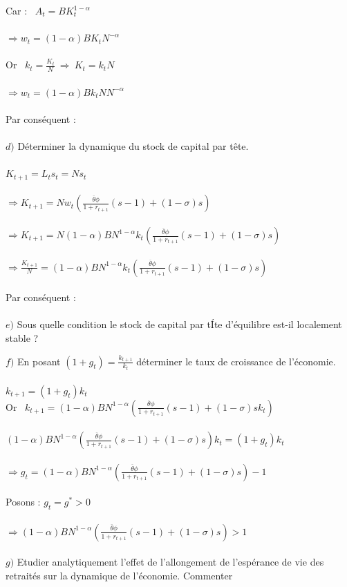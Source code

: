 \documentclass[11pt,twoside,a4paper]{article}
\begin{document}
Car : \ $A_t=BK^{1-\alpha}_t$\\ \\
$ \Rightarrow w_t=(1-\alpha)B K_tN^{-\alpha}$\\ \\
Or \ $k_t=\frac{K_t}{N} \ \Rightarrow \ K_t=k_tN$\\ \\
$ \Rightarrow w_t=(1-\alpha)B k_tNN^{-\alpha}$\\ \\
Par conséquent : \ \\ \\

$d)$ Déterminer la dynamique du stock de capital par t\^{e}te.\\ \\
$K_{t+1}=L_ts_t=Ns_t$\\ \\
$\Rightarrow K_{t+1}=Nw_t\left(\frac{\overline{\theta}\phi}{1+r_{t+1}}(s-1) +(1- \sigma)s \right)$\\ \\
$\Rightarrow K_{t+1}=N(1-\alpha)B N^{1-\alpha}k_t\left(\frac{\overline{\theta}\phi}{1+r_{t+1}}(s-1) +(1- \sigma)s \right)$\\ \\
$\Rightarrow \frac{K_{t+1}}{N}=(1-\alpha)B N^{1-\alpha}k_t\left(\frac{\overline{\theta}\phi}{1+r_{t+1}}(s-1) +(1- \sigma)s \right)$\\ \\
Par conséquent : \ \\ \\
$e)$ Sous quelle condition le stock de capital par tÍte d'équilibre est-il localement stable ?


$f)$ En posant  $(1+g_t)=\frac{k_{t+1}}{k_t}$ déterminer le taux de croissance de l'économie.\\ \\
$k_{t+1}=(1+g_t)k_t$\\
Or \ $k_{t+1}=(1-\alpha)B N^{1-\alpha}\left(\frac{\overline{\theta}\phi}{1+r_{t+1}}(s-1) +(1- \sigma)sk_t \right)$\\ \\
$(1-\alpha)B N^{1-\alpha}\left(\frac{\overline{\theta}\phi}{1+r_{t+1}}(s-1) +(1- \sigma)s \right)k_t=(1+g_t)k_t$\\ \\
$\Rightarrow g_t=(1-\alpha)B N^{1-\alpha}\left(\frac{\overline{\theta}\phi}{1+r_{t+1}}(s-1) +(1- \sigma)s \right)-1$\\ \\
Posons : $g_t=g^*>0$\\ \\
$\Rightarrow (1-\alpha)B N^{1-\alpha}\left(\frac{\overline{\theta}\phi}{1+r_{t+1}}(s-1) +(1- \sigma)s \right)>1$\\ \\


$g)$ Etudier analytiquement l'effet de l'allongement de l'espérance de vie des
retraités sur la dynamique de l'économie. Commenter
\end{document}
